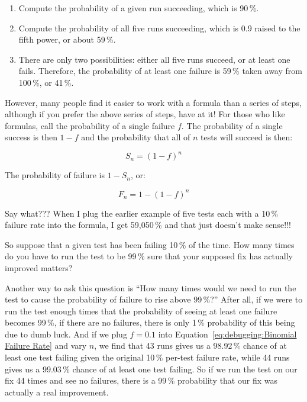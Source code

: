 \begin{enumerate}
\item	Compute the probability of a given run succeeding, which is 90\,\%.
\item	Compute the probability of all five runs succeeding, which
	is 0.9 raised to the fifth power, or about 59\,\%.
\item	There are only two possibilities: either all five runs succeed,
	or at least one fails.
	Therefore, the probability of at least one failure is
	59\,\% taken away from 100\,\%, or 41\,\%.
\end{enumerate}

However, many people find it easier to work with a formula than a series
of steps, although if you prefer the above series of steps, have at it!
For those who like formulas, call the probability of a single failure $f$.
The probability of a single success is then $1-f$ and the probability
that all of $n$ tests will succeed is then:

\begin{equation}
	S_n = \left(1-f\right)^n
\end{equation}

The probability of failure is $1-S_n$, or:

\begin{equation}
	F_n = 1-\left(1-f\right)^n
\label{eq:debugging:Binomial Failure Rate}
\end{equation}

\QuickQuiz{}
	Say what???
	When I plug the earlier example of five tests each with a
	10\,\% failure rate into the formula, I get 59,050\,\% and that
	just doesn't make sense!!!
 \QuickQuizEnd

So suppose that a given test has been failing 10\,\% of the time.
How many times do you have to run the test to be 99\,\% sure that
your supposed fix has actually improved matters?

Another way to ask this question is ``How many times would we need
to run the test to cause the probability of failure to rise above 99\,\%?''
After all, if we were to run the test enough times that the probability
of seeing at least one failure becomes 99\,\%, if there are no failures,
there is only 1\,\% probability of this being due to dumb luck.
And if we plug $f=0.1$ into
Equation~\ref{eq:debugging:Binomial Failure Rate} and vary $n$,
we find that 43 runs gives us a 98.92\,\% chance of at least one test failing
given the original 10\,\% per-test failure rate,
while 44 runs gives us a 99.03\,\% chance of at least one test failing.
So if we run the test on our fix 44 times and see no failures, there
is a 99\,\% probability that our fix was actually a real improvement.

